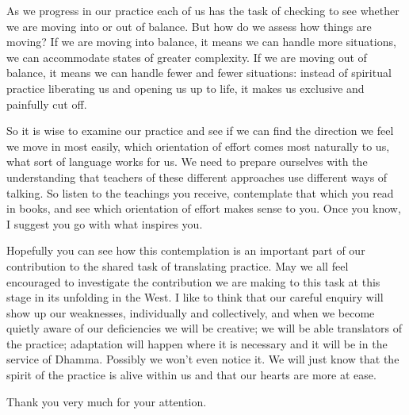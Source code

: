 As we progress in our practice each of us has the task of checking to
see whether we are moving into or out of balance. But how do we assess
how things are moving? If we are moving into balance, it means we can
handle more situations, we can accommodate states of greater complexity.
If we are moving out of balance, it means we can handle fewer and fewer
situations: instead of spiritual practice liberating us and opening us
up to life, it makes us exclusive and painfully cut off.

So it is wise to examine our practice and see if we can find the
direction we feel we move in most easily, which orientation of effort
comes most naturally to us, what sort of language works for us. We need
to prepare ourselves with the understanding that teachers of these
different approaches use different ways of talking. So listen to the
teachings you receive, contemplate that which you read in books, and see
which orientation of effort makes sense to you. Once you know, I suggest
you go with what inspires you.

\sectionBreak

\enlargethispage{\baselineskip}

Hopefully you can see how this contemplation is an important part of our
contribution to the shared task of translating practice. May we all feel
encouraged to investigate the contribution we are making to this task at
this stage in its unfolding in the West. I like to think that our careful
enquiry will show up our weaknesses, individually and collectively, and
when we become quietly aware of our deficiencies we will be
creative; we will be able translators of the practice; adaptation will
happen where it is necessary and it will be in the service of Dhamma.
Possibly we won't even notice it. We will just know that the spirit of
the practice is alive within us and that our hearts are more at ease.

Thank you very much for your attention.

